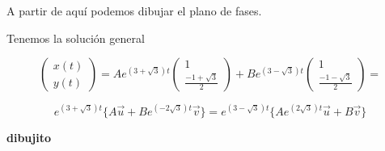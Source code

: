 \begin{example}
A partir de aquí podemos dibujar el plano de fases.

Tenemos la solución general

$$\begin{pmatrix}
x(t)\\y(t)
\end{pmatrix} = Ae^{(3+\sqrt{3})t}\begin{pmatrix}
1\\\frac{-1+\sqrt{3}}{2}
\end{pmatrix}+Be^{(3-\sqrt{3})t}\begin{pmatrix}
1\\\frac{-1-\sqrt{3}}{2}
\end{pmatrix} = $$

$$e^{(3+\sqrt{3})t}\{ A\vec{u} + Be^{(-2\sqrt{3})t}\vec{v} \} = e^{(3-\sqrt{3})t}\{ Ae^{(2\sqrt{3})t}\vec{u} +B\vec{v} \}$$

\textbf{dibujito}
\end{example}

